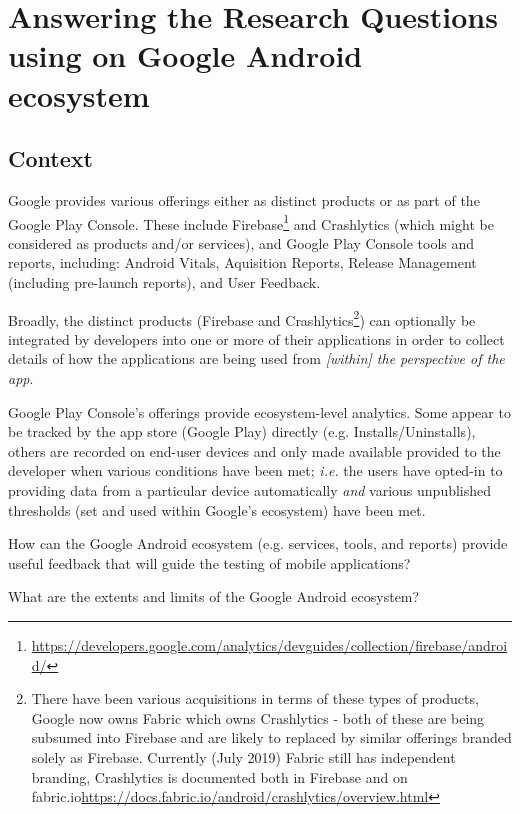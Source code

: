 \section{Answering the Research Questions using on Google Android ecosystem}
\subsection{Context}
Google provides various offerings either as distinct products or as part of the Google Play Console. These include Firebase\footnote{\url{https://developers.google.com/analytics/devguides/collection/firebase/android/}} and Crashlytics (which might be considered as products and/or services), and Google Play Console tools and reports, including: Android Vitals, Aquisition Reports, Release Management (including pre-launch reports), and User Feedback.

Broadly, the distinct products (Firebase and Crashlytics\footnote{There have been various acquisitions in terms of these types of products, Google now owns Fabric which owns Crashlytics - both of these are being subsumed into Firebase and are likely to replaced by similar offerings branded solely as Firebase. Currently (July 2019) Fabric still has independent branding, Crashlytics is documented both in Firebase and on fabric.io\url{https://docs.fabric.io/android/crashlytics/overview.html}}) can optionally be integrated by developers into one or more of their applications in order to collect details of how the applications are being used from \textit{[within] the perspective of the app}. 

Google Play Console's offerings provide ecosystem-level analytics. Some appear to be tracked by the app store (Google Play) directly (e.g. Installs/Uninstalls), others are recorded on end-user devices and only made available provided to the developer when various conditions have been met; \textit{i.e.} the users have opted-in to providing data from a particular device automatically \textit{and} various unpublished thresholds (set and used within Google's ecosystem) have been met.

How can the Google Android ecosystem (e.g. services, tools, and reports) provide useful feedback that will guide the testing of mobile applications?

What are the extents and limits of the Google Android ecosystem?

